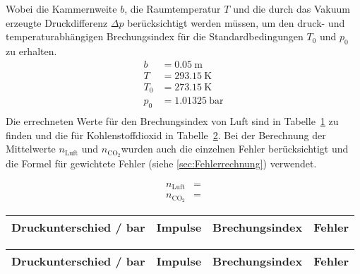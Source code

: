 Wobei die Kammernweite $b$, die Raumtemperatur $T$ und die durch das Vakuum erzeugte Druckdifferenz $\Delta p$ berücksichtigt werden müssen, um den druck- und temperaturabhängigen Brechungsindex für die Standardbedingungen $T_0$ und $p_0$ zu erhalten.
\begin{align*}
	b &= \SI{0.05}{\meter} \\
	T &= \SI{293.15}{\kelvin} \\
	T_0 &= \SI {273.15}{\kelvin} \\
	p_0 &= \SI{1.01325}{\bar} \\
\end{align*}
Die errechneten Werte für den Brechungsindex von Luft sind in Tabelle~\ref{tab:BrechungsindexLuft} zu finden und die für Kohlenstoffdioxid in Tabelle~\ref{tab:BrechungsindexCO2}.
Bei der Berechnung der Mittelwerte $n_\text{Luft}$ und $n_\text{CO$_2$}$wurden auch die einzelnen Fehler berücksichtigt und die Formel für gewichtete Fehler (siehe \ref{sec:Fehlerrechnung})  verwendet.

\begin{align}
	n_\text{Luft} &= \\
	n_\text{CO$_2$} &= 
\end{align}

\begin{table}[h!]
	\centering	
	\begin{tabular}{cccc}
		Druckunterschied / \si{\bar} & Impulse & Brechungsindex & Fehler \\
		\hline
		
	\end{tabular}
	\label{tab:BrechungsindexLuft}
\end{table}


\begin{table}[h!]
	\centering
	\begin{tabular}{cccc}
		Druckunterschied / \si{\bar} & Impulse & Brechungsindex   & Fehler \\
		\hline
		
	\end{tabular}
	\label{tab:BrechungsindexCO2}
\end{table}
















